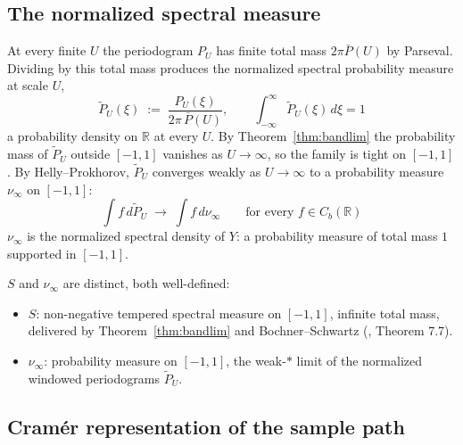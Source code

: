 \documentclass[11pt]{article}
\begin{document}
\subsection{The normalized spectral measure}\label{app:normalized}

At every finite $U$ the periodogram $P_U$ has finite total mass $2\pi\bar P(U)$ by Parseval. Dividing by this total mass produces the normalized spectral probability measure at scale $U$,
\begin{equation}\label{eq:Ptildedef}
\widetilde P_U(\xi) \;:=\; \frac{P_U(\xi)}{2\pi\,\bar P(U)},\qquad \int_{-\infty}^{\infty}\widetilde P_U(\xi)\,d\xi = 1
\end{equation}
a probability density on $\mathbb{R}$ at every $U$. By Theorem~\ref{thm:bandlim} the probability mass of $\widetilde P_U$ outside $[-1,1]$ vanishes as $U\to\infty$, so the family is tight on $[-1,1]$. By Helly--Prokhorov, $\widetilde P_U$ converges weakly as $U\to\infty$ to a probability measure $\nu_\infty$ on $[-1,1]$:
\begin{equation}\label{eq:Ptildeweak}
\int f\,d\widetilde P_U \;\longrightarrow\; \int f\,d\nu_\infty\qquad \text{for every } f\in C_b(\mathbb{R})
\end{equation}
$\nu_\infty$ is the normalized spectral density of $Y$: a probability measure of total mass $1$ supported in $[-1,1]$.

$S$ and $\nu_\infty$ are distinct, both well-defined:
\begin{itemize}[leftmargin=*]
\item $S$: non-negative tempered spectral measure on $[-1,1]$, infinite total mass, delivered by Theorem~\ref{thm:bandlim} and Bochner--Schwartz (\cite{Rudin-FA}, Theorem 7.7).
\item $\nu_\infty$: probability measure on $[-1,1]$, the weak-$*$ limit of the normalized windowed periodograms $\widetilde P_U$.
\end{itemize}

\subsection{Cram\'er representation of the sample path}\label{app:cramer}
\end{document}
